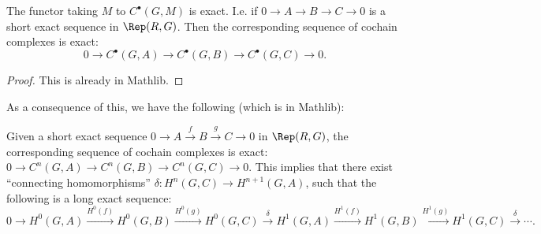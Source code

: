 \begin{lemma} \label{lem:cochainsFunctor exact}
	\mathlibok
  The functor taking $M$ to $C^\bullet (G,M)$ is exact.
  I.e. if $0 \to A \to B \to C \to 0$ is a short exact sequence in $\Rep(R,G)$.
  Then the corresponding sequence of cochain complexes is exact:
  \[
    0 \to C^\bullet(G,A) \to C^\bullet(G,B) \to C^\bullet(G,C) \to 0.
  \]
\end{lemma}

\begin{proof}
	This is already in Mathlib.
	\mathlibok
\end{proof}

As a consequence of this, we have the following (which is in Mathlib):

\begin{definition} \label{def:cohomology long exact sequence}
	\mathlibok
	\leanok
  Given a short exact sequence $0 \to A \stackrel{f}\to B \stackrel{g}\to C \to 0$ in $\Rep(R,G)$,
  the corresponding sequence of cochain complexes is exact:
  $0 \to C^n(G,A) \to C^n(G,B) \to C^n(G,C) \to 0$.
  This implies that there exist ``connecting homomorphisms''
	$\delta : H^n(G,C) \to H^{n+1}(G,A)$,
  such that the following is a long exact sequence:
  \[
    0 \to H^0(G,A) \stackrel{H^0(f)}\to H^0(G,B) \stackrel{H^0(g)}\to H^0(G,C) \stackrel{\delta}\to
    H^1(G,A) \stackrel{H^1(f)}\to H^1(G,B) \stackrel{H^1(g)} \to H^1(G,C) \stackrel{\delta}\to \cdots.
  \]
\end{definition}

